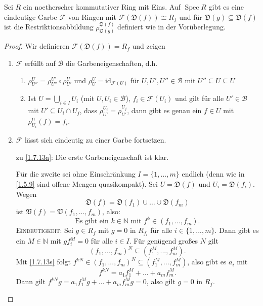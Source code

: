 \documentclass[a4paper,12pt]{scrbook}
\theoremstyle{keinenummern} %
\theoremstyle{mitnummern}
\theoremstyle{unserbeweis}
\newtheorem{proof}{Beweis}
\def\V{\mathfrak{V}}
\newcommand{\D}{\mathfrak{D}}
\def\B{\mathcal{B}}
\newcommand{\F}{\mathcal{F}}
\newcommand{\Spec}{\operatorname{Spec}}
\newcommand{\id}{\mathrm{id}}
\renewcommand{\dotsc}{\ensuremath{\!...}}
\newcommand{\set}[1]{\ensuremath{\mathbb{#1}}}
\newcommand{\N}{\set{N}}
\begin{document}
\begin{prop}\label{1.7.13}
  Sei $R$ ein noetherscher kommutativer Ring mit Eins.
  Auf $\Spec R$ gibt es eine eindeutige Garbe $\F$ von Ringen mit $\F(\D(f))\cong R_f$ und für $\D(g)\subseteq
  \D(f)$ ist die Restriktionsabbildung $\rho_{\D(g)}^{\D(f)}$ definiert wie in der Vorüberlegung.
\end{prop}
\begin{proof}
  Wir definieren $\F(\D(f))=R_f$ und zeigen
  \begin{enumerate}
  \item{} $\F$ erfüllt auf $\B$ die Garbeneigenschaften, d.h.
    \begin{enumerate}[label=(\textsc{g}\arabic*)]
    \item\label{G1} $\rho_{U''}^U=\rho_{U''}^{U'}\circ\rho_{U'}^U$ und $\rho_U^U=\id_{\F(U)}$ für
      $U,U',U''\in\B$ mit $U''\subseteq U\subseteq U$
    \item\label{G2} Ist $U=\bigcup_{i\in I}U_i$ (mit $U,U_i\in\B$), $f_i\in\F(U_i)$ und gilt für alle
      $U'\in\B$ mit $U'\subseteq U_i\cap U_j$, dass $\rho_{U'}^{U_i}=\rho_{U'}^{U_j}$, dann gibt es genau ein
      $f\in U$ mit $\rho_{U_i}^U(f)=f_i$.
    \end{enumerate}
  \item{} $\F$ lässt sich eindeutig zu einer Garbe fortsetzen.
  \end{enumerate}
  \begin{enumerate}
  \item[zu] \ref{1.7.13a}: Die erste Garbeneigenschaft ist klar. 
  
  Für die zweite sei ohne Einschränkung $I=\{1,\dotsc,m\}$ endlich
    (denn wie in \cref{1.5.9} sind offene Mengen quasikompakt). Sei $U=\D(f)$ und $U_i=\D(f_i)$. Wegen
    \[\D(f)=\D(f_1)\cup\dotso\cup \D(f_m)\] ist $\V(f)=\V(f_1,\dotsc,f_m)$, also: 
    \begin{equation}\label{1.7.13s}\text{Es gibt ein }k\in\N\text{ mit }f^k\in(f_1,\dotsc,f_m).\tag{$*$}\end{equation}
%
    \textsc{Eindeutigkeit}: Sei $g\in R_f$ mit $g=0$ in $R_{f_i}$ für alle $i\in\{1,\dotsc,m\}$. Dann gibt es ein $M\in\N$ mit
    $gf_i^M=0$ für alle $i\in I$. Für genügend großes $N$ gilt 
    \[(f_1,\dotsc,f_m)^N\subseteq(f_1^M,\dotsc,f_m^M).\] 
    Mit \cref{1.7.13s}
    folgt $f^{kN}\in(f_1,\dotsc,f_m)^N\subseteq(f_1^M,\dotsc,f_m^M)$, also gibt es $a_i$ mit
    \[f^{kN}=a_1f_1^M+\dotso+a_mf_m^M.\]
    Dann gilt $f^{kN}g=a_1f_1^Mg+\dotso+a_mf_m^Mg=0$, also gilt $g=0$ in $R_f$.


\end{enumerate}
\end{proof}
\end{document}
